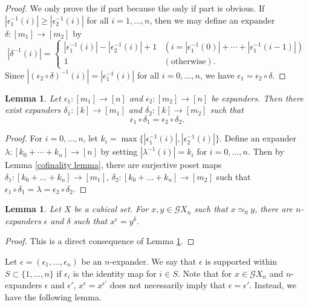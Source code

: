 \documentclass[oneside, 12pt]{amsart}
\numberwithin{equation}{section}
\theoremstyle{plain}
\newtheorem{lemma}[theorem]{Lemma}
\theoremstyle{definition}
\theoremstyle{remark}
\begin{document}
	\begin{proof}
		We only prove the if part because the only if part is obvious. If $|\epsilon_1^{-1}(i)|\ge|\epsilon_2^{-1}(i)|$ for all $i=1,\ldots,n$, then we may define an expander $\delta\colon[m_1]\to[m_2]$ by
		\[
		|\delta^{-1}(i)|=
		\begin{cases}
			|\epsilon_1^{-1}(i)|-|\epsilon_2^{-1}(i)|+1&(i=|\epsilon_1^{-1}(0)|+\cdots+|\epsilon_1^{-1}(i-1)|)\\
			1&(\text{otherwise}).
		\end{cases}
		\]
		Since $|(\epsilon_2\circ\delta)^{-1}(i)|=|\epsilon_1^{-1}(i)|$ for all $i=0,\ldots,n$, we have $\epsilon_1=\epsilon_2\circ\delta$.
	\end{proof}
	
	
	
	\begin{lemma}
		\label{cofinality}
		Let $\epsilon_1\colon[m_1]\to[n]$ and $\epsilon_2\colon[m_2]\to[n]$ be expanders. Then there exist expanders $\delta_1\colon[k]\to[m_1]$ and $\delta_2\colon[k]\to[m_2]$ such that
		\[
		\epsilon_1\circ\delta_1=\epsilon_2\circ\delta_2.
		\]
	\end{lemma}
	
	\begin{proof}
		For $i=0,\ldots,n$, let $k_i=\max\{|\epsilon_1^{-1}(i)|,|\epsilon_2^{-1}(i)|\}$. Define an expander $\lambda\colon[k_0+\cdots+k_n]\to[n]$ by setting $|\lambda^{-1}(i)|=k_i$ for $i=0,\ldots,n$. Then by Lemma \ref{cofinality lemma}, there are surjective poset maps $\delta_1\colon[k_0+\ldots+k_n]\to[m_1]$, $\delta_2\colon[k_0+\ldots+k_n]\to[m_2]$ such that $\epsilon_1\circ\delta_1=\lambda=\epsilon_2\circ\delta_2$.
	\end{proof}
	
	
	\begin{lemma}
		\label{common expansion}
		Let $X$ be a cubical set. For $x,y\in\mathcal{G}X_n$ such that $x\simeq_0y$, there are $n$-expanders $\epsilon$ and $\delta$ such that $x^\epsilon=y^\delta$.
	\end{lemma}
	
	\begin{proof}
		This is a direct consequence of Lemma \ref{cofinality}.
	\end{proof}
	
	
	
	Let $\epsilon=(\epsilon_1,\ldots,\epsilon_n)$ be an $n$-expander. We say that $\epsilon$ is supported within $S\subset\{1,\ldots,n\}$ if $\epsilon_i$ is the identity map for $i\in S$. Note that for $x\in\mathcal{G}X_n$ and $n$-expanders $\epsilon$ and $\epsilon'$, $x^\epsilon=x^{\epsilon'}$ does not necessarily imply that $\epsilon=\epsilon'$. Instead, we have the following lemma.
	
\end{document}
